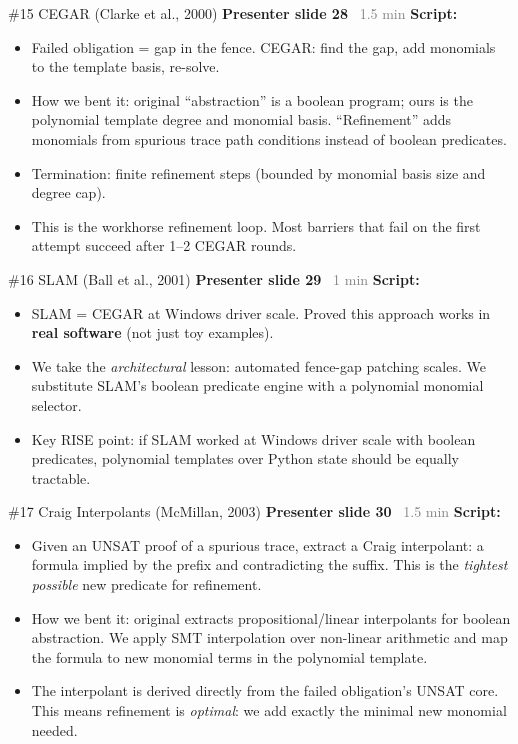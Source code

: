 \documentclass[aspectratio=169]{beamer}
\newcommand{\syncline}[2]{\textbf{#1} \hfill \textcolor{gray}{#2}}
\begin{document}
\begin{frame}{\#15 CEGAR (Clarke et al., 2000)}
\syncline{Presenter slide 28}{~1.5 min}
\textbf{Script:}
\begin{itemize}
  \item Failed obligation = gap in the fence. CEGAR: find the gap, add monomials to the template basis, re-solve.
  \item How we bent it: original ``abstraction'' is a boolean program; ours is the polynomial template degree and monomial basis. ``Refinement'' adds monomials from spurious trace path conditions instead of boolean predicates.
  \item Termination: finite refinement steps (bounded by monomial basis size and degree cap).
  \item This is the workhorse refinement loop. Most barriers that fail on the first attempt succeed after 1--2 CEGAR rounds.
\end{itemize}
\end{frame}

\begin{frame}{\#16 SLAM (Ball et al., 2001)}
\syncline{Presenter slide 29}{~1 min}
\textbf{Script:}
\begin{itemize}
  \item SLAM = CEGAR at Windows driver scale. Proved this approach works in \textbf{real software} (not just toy examples).
  \item We take the \emph{architectural} lesson: automated fence-gap patching scales. We substitute SLAM's boolean predicate engine with a polynomial monomial selector.
  \item Key RISE point: if SLAM worked at Windows driver scale with boolean predicates, polynomial templates over Python state should be equally tractable.
\end{itemize}
\end{frame}

\begin{frame}{\#17 Craig Interpolants (McMillan, 2003)}
\syncline{Presenter slide 30}{~1.5 min}
\textbf{Script:}
\begin{itemize}
  \item Given an UNSAT proof of a spurious trace, extract a Craig interpolant: a formula implied by the prefix and contradicting the suffix. This is the \emph{tightest possible} new predicate for refinement.
  \item How we bent it: original extracts propositional/linear interpolants for boolean abstraction. We apply SMT interpolation over non-linear arithmetic and map the formula to new monomial terms in the polynomial template.
  \item The interpolant is derived directly from the failed obligation's UNSAT core. This means refinement is \emph{optimal}: we add exactly the minimal new monomial needed.
\end{itemize}
\end{frame}
\end{document}

